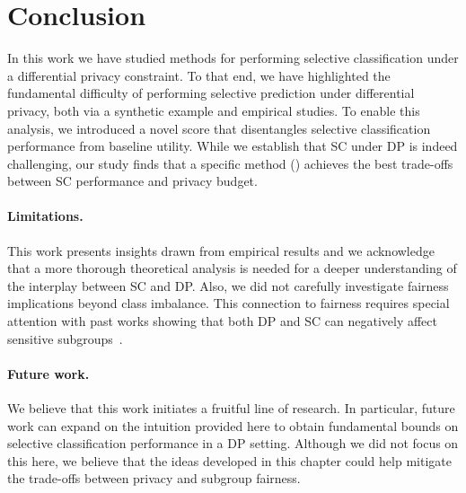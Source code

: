 


\section{Conclusion}
\label{sec:concl}

In this work we have studied methods for performing selective classification under a differential privacy constraint. To that end, we have highlighted the fundamental difficulty of performing selective prediction under differential privacy, both via a synthetic example and empirical studies. To enable this analysis, we introduced a novel score that disentangles selective classification performance from baseline utility. While we establish that SC under DP is indeed challenging, our study finds that a specific method (\sctd) achieves the best trade-offs between SC performance and privacy budget. %

\paragraph{Limitations.} This work presents insights drawn from empirical results and we acknowledge that a more thorough theoretical analysis is needed for a deeper understanding of the interplay between SC and DP. Also, we did not carefully investigate fairness implications beyond class imbalance. This connection to fairness requires special attention with past works showing that both DP and SC can negatively affect sensitive subgroups~\citep{jones2020selective, bagdasaryan2019differential}.

\paragraph{Future work.} We believe that this work initiates a fruitful line of research. 
In particular, future work can expand on the intuition provided here to obtain fundamental bounds on selective classification performance in a DP setting. Although we did not focus on this here, we believe that the ideas developed in this chapter could help mitigate the trade-offs between privacy and subgroup fairness.

